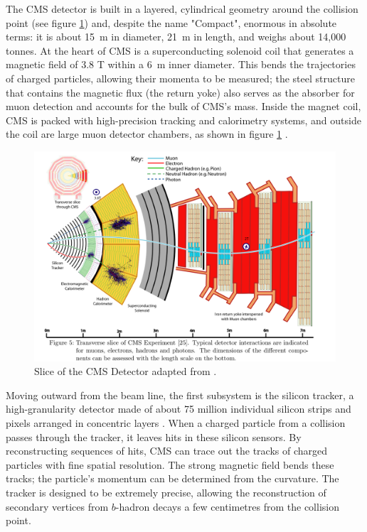 The CMS detector is built in a layered, cylindrical geometry around the collision point (see figure \ref{fig:cms_overview}) and, despite the name "Compact", enormous in absolute terms: it is about 15~m in diameter, 21~m in length, and weighs about 14,000 tonnes. At the heart of CMS is a superconducting solenoid coil that generates a magnetic field of 3.8 T within a 6~m inner diameter. This bends the trajectories of charged particles, allowing their momenta to be measured; the steel structure that contains the magnetic flux (the return yoke) also serves as the absorber for muon detection and accounts for the bulk of CMS’s mass. Inside the magnet coil, CMS is packed with high-precision tracking and calorimetry systems, and outside the coil are large muon detector chambers, as shown in figure \ref{fig:cms_overview} \cite{CMS}.

\begin{figure}[h]
\centering
    \includegraphics[width=15cm]{media/cms_cutview.png}
    \caption{Slice of the CMS Detector adapted from \cite{Sirunyan_2017}.}
    \label{fig:cms_overview}
\end{figure}

Moving outward from the beam line, the first subsystem is the silicon tracker, a high-granularity detector made of about 75 million individual silicon strips and pixels arranged in concentric layers \cite{CMS}. When a charged particle from a collision passes through the tracker, it leaves hits in these silicon sensors. By reconstructing sequences of hits, CMS can trace out the tracks of charged particles with fine spatial resolution. The strong magnetic field bends these tracks; the particle’s momentum can be determined from the curvature. The tracker is designed to be extremely precise, allowing the reconstruction of secondary vertices from $b$-hadron decays a few centimetres from the collision point.

